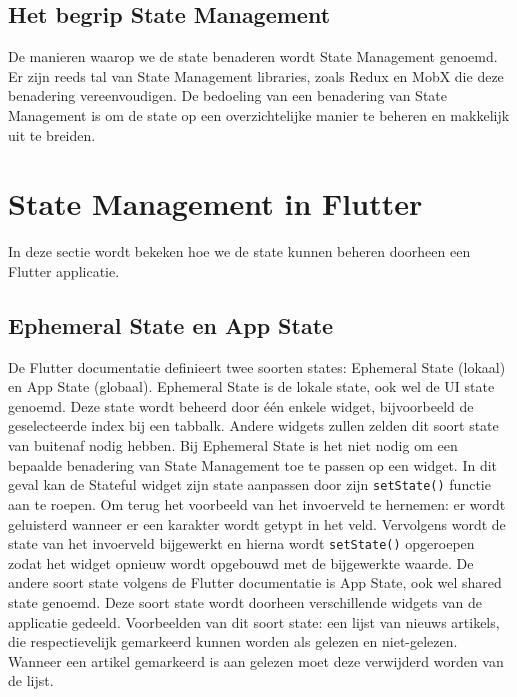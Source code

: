 \subsection{Het begrip State Management}
De manieren waarop we de state benaderen wordt State Management genoemd. Er zijn reeds tal van State Management libraries, zoals Redux en MobX die deze benadering vereenvoudigen. De bedoeling van een benadering van State Management is om de state op een overzichtelijke manier te beheren en makkelijk uit te breiden.

\section{State Management in Flutter}
In deze sectie wordt bekeken hoe we de state kunnen beheren doorheen een Flutter applicatie.

\subsection{Ephemeral State en App State}
De Flutter documentatie definieert twee soorten states: Ephemeral State (lokaal) en App State (globaal).
Ephemeral State is de lokale state, ook wel de UI state genoemd. Deze state wordt beheerd door één enkele widget, bijvoorbeeld de geselecteerde index bij een tabbalk. Andere widgets zullen zelden dit soort state van buitenaf nodig hebben. Bij Ephemeral State is het niet nodig om een bepaalde benadering van State Management toe te passen op een widget. In dit geval kan de Stateful widget zijn state aanpassen door zijn \verb|setState()| functie aan te roepen.
Om terug het voorbeeld van het invoerveld te hernemen: er wordt geluisterd wanneer er een karakter wordt getypt in het veld. Vervolgens wordt de state van het invoerveld bijgewerkt en hierna wordt \verb|setState()| opgeroepen zodat het widget opnieuw wordt opgebouwd met de bijgewerkte waarde.
\newline
De andere soort state volgens de Flutter documentatie \autocite{Developers2019} is App State, ook wel shared state genoemd. Deze soort state wordt doorheen verschillende widgets van de applicatie gedeeld.
Voorbeelden van dit soort state: een lijst van nieuws artikels, die respectievelijk gemarkeerd kunnen worden als gelezen en niet-gelezen. Wanneer een artikel gemarkeerd is aan gelezen moet deze verwijderd worden van de lijst. 
\newline

